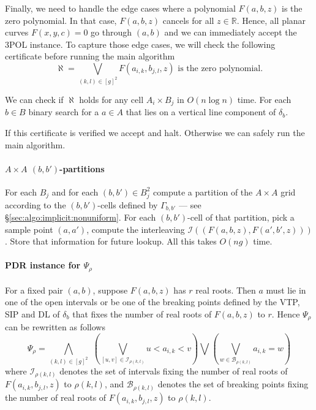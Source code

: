 Finally, we need to handle the edge cases where a polynomial $F(a,b,z)$ is the
zero polynomial. In that case, $F(a,b,z)$ cancels for all $z \in
\mathbb{R}$. Hence, all planar curves $F(x,y,c)=0$ go through $(a,b)$ and we
can immediately accept the 3POL instance. To capture
those edge cases, we will check the following certificate before running the main
algorithm
\begin{displaymath}
	\aleph = \bigvee_{(k,l)\in{{[g]}^2}} F(a_{i,k},b_{j,l},z)\,\,\text{is the zero polynomial}.
\end{displaymath}

We can check if $\aleph$ holds for any cell $A_i \times B_j$ in $O(n \log n)$ time.
For each $b \in B$ binary search for a $a \in A$ that lies on a vertical line
component of $\delta_b$.

If this certificate is verified we accept and halt. Otherwise we can safely run
the main algorithm.

\paragraph{$A \times A$ $(b,b')$-partitions}
For each $B_j$ and for each $(b,b') \in B_j^2$ compute a partition of the
$A \times A$ grid according to the $(b,b')$-cells defined by $\Gamma_{b,b'}$
--- see \S\ref{sec:algo:implicit:nonuniform}. For each $(b,b')$-cell of
that partition, pick a sample point $(a,a')$, compute the interleaving
$\mathcal{I}((F(a,b,z),F(a',b',z)))$. Store that information for future lookup.
All this takes $O(ng)$ time.

\paragraph{PDR instance for $\Psi_\rho$}
For a fixed pair $(a,b)$, suppose $F(a,b,z)$ has $r$ real roots. Then $a$ must
lie in one of the open intervals or be one of the breaking points defined by
the VTP, SIP and DL of $\delta_b$ that fixes the number of real roots of
$F(a,b,z)$ to $r$.
Hence $\Psi_\rho$ can be rewritten as follows
\begin{displaymath}
	\Psi_{\rho} =
	\bigwedge_{(k,l)\in{[g]}^2}\,\,
	\left(\bigvee_{[u,v]\in \mathcal{I}_{\rho(k,l)}} u < a_{i,k} < v\right)
	\bigvee
	\left(\bigvee_{w\in \mathcal{B}_{\rho(k,l)}} a_{i,k} = w\right)
\end{displaymath}
where $\mathcal{I}_{\rho(k,l)}$ denotes the set of intervals fixing the number
of real roots of $F(a_{i,k},b_{j,l},z)$ to $\rho(k,l)$, and
$\mathcal{B}_{\rho(k,l)}$ denotes the set of breaking points fixing the number
of real roots of $F(a_{i,k},b_{j,l},z)$ to $\rho(k,l)$.

